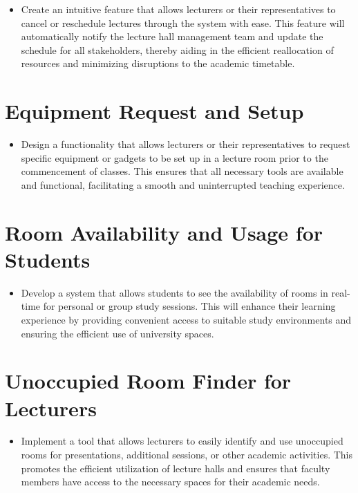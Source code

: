 \documentclass[12pt]{article}
\begin{document}
\begin{itemize}
    \item Create an intuitive feature that allows lecturers or their representatives to cancel or reschedule lectures through the system with ease. This feature will automatically notify the lecture hall management team and update the schedule for all stakeholders, thereby aiding in the efficient reallocation of resources and minimizing disruptions to the academic timetable.
\end{itemize}

\section*{Equipment Request and Setup}

\begin{itemize}
    \item Design a functionality that allows lecturers or their representatives to request specific equipment or gadgets to be set up in a lecture room prior to the commencement of classes. This ensures that all necessary tools are available and functional, facilitating a smooth and uninterrupted teaching experience.
\end{itemize}

\section*{Room Availability and Usage for Students}

\begin{itemize}
    \item Develop a system that allows students to see the availability of rooms in real-time for personal or group study sessions. This will enhance their learning experience by providing convenient access to suitable study environments and ensuring the efficient use of university spaces.
\end{itemize}

\section*{Unoccupied Room Finder for Lecturers}

\begin{itemize}
    \item Implement a tool that allows lecturers to easily identify and use unoccupied rooms for presentations, additional sessions, or other academic activities. This promotes the efficient utilization of lecture halls and ensures that faculty members have access to the necessary spaces for their academic needs.
\end{itemize}
\end{document}
